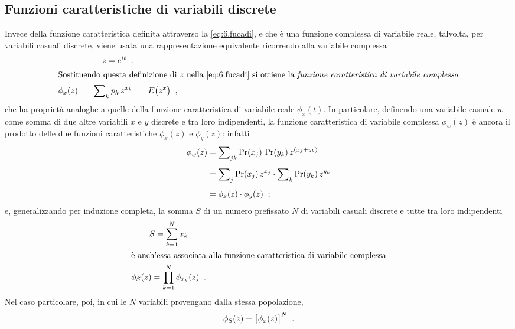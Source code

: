 \subsection{Funzioni caratteristiche di variabili discrete}%
Invece della funzione caratteristica definita attraverso la
\eqref{eq:6.fucadi}, e che \`e una funzione complessa di
variabile reale, talvolta, per variabili casuali discrete,
viene usata una rappresentazione equivalente ricorrendo alla
variabile complessa
\begin{gather*}
  z = e^{it} \;\; . \\
  \intertext{Sostituendo questa definizione di $z$ nella
    \eqref{eq:6.fucadi} si ottiene la \emph{funzione
      caratteristica di variabile complessa}}
  \phi_x (z) \; = \; \sum\nolimits_k p_k \, z^{x_k} \; = \;
  E \bigl( z^x \bigr) \;\; ,
\end{gather*}
che ha propriet\`a analoghe a quelle della funzione
caratteristica di variabile reale $\phi_x(t)$.  In
particolare, definendo una variabile casuale $w$ come somma
di due altre variabili $x$ e $y$ discrete e tra loro
indipendenti, la funzione caratteristica di variabile
complessa $\phi_w(z)$ \`e ancora il prodotto delle due
funzioni caratteristiche $\phi_x(z)$ e $\phi_y(z)$: infatti
\begin{align*}
  \phi_w (z) &= \sum\nolimits_{jk} \Pr ( x_j ) \,
  \Pr ( y_k ) \, z^{\left( x_j + y_k \right)}
  \\[1ex]
  &= \sum\nolimits_j \Pr ( x_j ) \, z^{x_j} \cdot
  \sum\nolimits_k \Pr ( y_k ) \, z^{y_k} \\[1ex]
  &= \phi_x(z) \cdot \phi_y(z) \;\; ;
\end{align*}
e, generalizzando per induzione completa, la somma $S$ di un
numero prefissato $N$ di variabili casuali discrete e tutte
tra loro indipendenti
\begin{gather*}
  S = \sum_{k=1}^N x_k \\
  \intertext{\`e anch'essa associata alla funzione
    caratteristica di variabile complessa}
  \phi_S (z) = \prod_{k=1}^N \phi_{x_k} (z) \;\; .
\end{gather*}
Nel caso particolare, poi, in cui le $N$ variabili
provengano dalla stessa popolazione,
\begin{equation} \label{eq:6.fixedn}
  \phi_S (z) = \bigl[ \phi_x (z) \bigr] ^N \;\; .
\end{equation}

